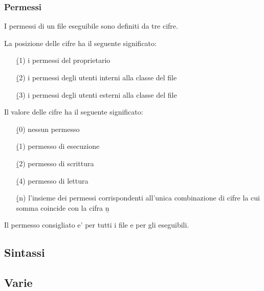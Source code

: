 \subsubsection{Permessi}

\bbox \; I permessi di un file eseguibile sono definiti da tre cifre.

\skipline

\bbox \; La posizione delle cifre ha il seguente significato:
\begin{itemize}
\item[\b{(1)}] i permessi del proprietario
\item[\b{(2)}] i permessi degli utenti interni alla classe del file
\item[\b{(3)}] i permessi degli utenti esterni alla classe del file
\end{itemize}

\skipline

\bbox \; Il valore delle cifre ha il seguente significato:
\begin{itemize}
\item[\b{(0)}] nessun permesso
\item[\b{(1)}] permesso di esecuzione
\item[\b{(2)}] permesso di scrittura
\item[\b{(4)}] permesso di lettura
\item[\b{(n)}] l'insieme dei permessi corrispondenti all'unica combinazione di cifre la cui somma coincide con la cifra \b{n}
\end{itemize}

\skipline

\bbox \; Il permesso consigliato e'  per tutti i file e  per gli eseguibili.

\subsection{Sintassi}


\subsection{Varie}

